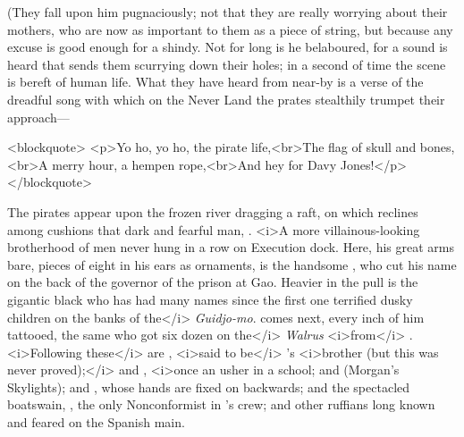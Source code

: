 \begin{stagedir}
(They fall upon him pugnaciously;
not that they are really worrying about their mothers, who are now as important to them as a piece of string,
but because any excuse is good enough for a shindy.
Not for long is he belaboured, for a sound is heard that sends them scurrying down their holes; in a second of time the scene is bereft of human life.
What they have heard from near-by is a verse of the dreadful song with which on the Never Land the prates stealthily trumpet their approach—

\begin{drama}

\speakercontinues
<blockquote> <p>Yo ho, yo ho, the pirate life,<br>The flag of skull and bones,<br>A merry hour, a hempen rope,<br>And hey for Davy Jones!</p> </blockquote>

\end{drama}

The pirates appear upon the frozen river dragging a raft,
on which reclines among cushions that dark and fearful man, \captjashook.
<i>A more villainous-looking brotherhood of men never hung in a row on Execution dock.
Here, his great arms bare, pieces of eight in his ears as ornaments, is the handsome \cecco, who cut his name on the back of the governor of the prison at Gao.
Heavier in the pull is the gigantic black who has had many names since the first one terrified dusky children on the banks of the</i> \emph{Guidjo-mo}.
\billjukes comes next, every inch of him tattooed, the same \jukes who got six dozen on the</i> \emph{Walrus} <i>from</i> \flint.
<i>Following these</i> are \cookson, <i>said to be</i> \blackmurphy's <i>brother (but this was never proved);</i> and \gentlemanstarkey, <i>once an usher in a school; and \skylights (Morgan's Skylights); and \noodler, whose hands are fixed on backwards; and the spectacled boatswain, \smee, the only Nonconformist in \hook's crew; and other ruffians long known and feared on the Spanish main.


\end{stagedir}
